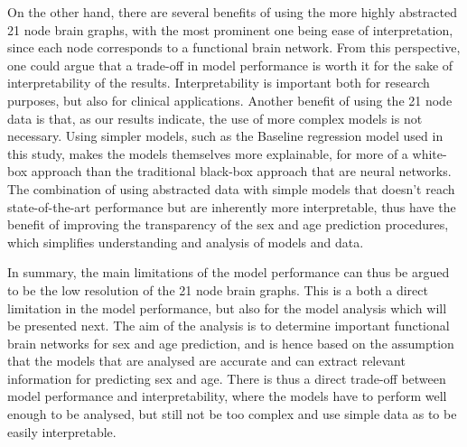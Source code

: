 On the other hand, there are several benefits of using the more highly abstracted 21 node brain graphs, with the most prominent one being ease of interpretation, since each node corresponds to a functional brain network. From this perspective, one could argue that a trade-off in model performance is worth it for the sake of interpretability of the results. Interpretability is important both for research purposes, but also for clinical applications. Another benefit of using the 21 node data is that, as our results indicate, the use of more complex models is not necessary. Using simpler models, such as the Baseline regression model used in this study, makes the models themselves more explainable, for more of a white-box approach than the traditional black-box approach that are neural networks. The combination of using abstracted data with simple models that doesn't reach state-of-the-art performance but are inherently more interpretable, thus have the benefit of improving the transparency of the sex and age prediction procedures, which simplifies understanding and analysis of models and data. 

In summary, the main limitations of the model performance can thus be argued to be the low resolution of the 21 node brain graphs. This is a both a direct limitation in the model performance, but also for the model analysis which will be presented next. The aim of the analysis is to determine important functional brain networks for sex and age prediction, and is hence based on the assumption that the models that are analysed are accurate and can extract relevant information for predicting sex and age. There is thus a direct trade-off between model performance and interpretability, where the models have to perform well enough to be analysed, but still not be too complex and use simple data as to be easily interpretable.



    












